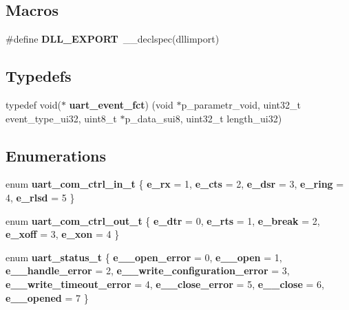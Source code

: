 \subsection*{Macros}
\begin{DoxyCompactItemize}
\item 
\mbox{\label{hw__dr__uart__driver__h_8h_a1ca888bd091694c05472e1b91df1a97b}} 
\#define {\bfseries D\+L\+L\+\_\+\+E\+X\+P\+O\+RT}~\+\_\+\+\_\+declspec(dllimport)
\end{DoxyCompactItemize}
\subsection*{Typedefs}
\begin{DoxyCompactItemize}
\item 
typedef void($\ast$ \textbf{ uart\+\_\+event\+\_\+fct}) (void $\ast$p\+\_\+parametr\+\_\+void, uint32\+\_\+t event\+\_\+type\+\_\+ui32, uint8\+\_\+t $\ast$p\+\_\+data\+\_\+sui8, uint32\+\_\+t length\+\_\+ui32)
\end{DoxyCompactItemize}
\subsection*{Enumerations}
\begin{DoxyCompactItemize}
\item 
enum \textbf{ uart\+\_\+com\+\_\+ctrl\+\_\+in\+\_\+t} \{ \newline
{\bfseries e\+\_\+rx} = 1, 
{\bfseries e\+\_\+cts} = 2, 
{\bfseries e\+\_\+dsr} = 3, 
{\bfseries e\+\_\+ring} = 4, 
\newline
{\bfseries e\+\_\+rlsd} = 5
 \}
\item 
\mbox{\label{group___u_a_r_t_ga780849ccdce6e933c3adff0ed074aafa}} 
enum {\bfseries uart\+\_\+com\+\_\+ctrl\+\_\+out\+\_\+t} \{ \newline
{\bfseries e\+\_\+dtr} = 0, 
{\bfseries e\+\_\+rts} = 1, 
{\bfseries e\+\_\+break} = 2, 
{\bfseries e\+\_\+xoff} = 3, 
\newline
{\bfseries e\+\_\+xon} = 4
 \}
\item 
\mbox{\label{group___u_a_r_t_gaf7d6a356f1601c95992ab6990320fd35}} 
enum {\bfseries uart\+\_\+status\+\_\+t} \{ \newline
{\bfseries e\+\_\+\_\+open\+\_\+error} = 0, 
{\bfseries e\+\_\+\_\+open} = 1, 
{\bfseries e\+\_\+\_\+handle\+\_\+error} = 2, 
{\bfseries e\+\_\+\_\+write\+\_\+configuration\+\_\+error} = 3, 
\newline
{\bfseries e\+\_\+\_\+write\+\_\+timeout\+\_\+error} = 4, 
{\bfseries e\+\_\+\_\+close\+\_\+error} = 5, 
{\bfseries e\+\_\+\_\+close} = 6, 
{\bfseries e\+\_\+\_\+opened} = 7
 \}
\end{DoxyCompactItemize}


